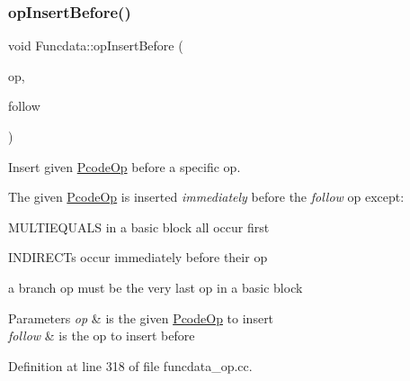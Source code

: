 \subsubsection{\texorpdfstring{opInsertBefore()}{opInsertBefore()}}
{\footnotesize\ttfamily void Funcdata\+::op\+Insert\+Before (\begin{DoxyParamCaption}\item[{\mbox{\hyperlink{class_pcode_op}{Pcode\+Op}} $\ast$}]{op,  }\item[{\mbox{\hyperlink{class_pcode_op}{Pcode\+Op}} $\ast$}]{follow }\end{DoxyParamCaption})}



Insert given \mbox{\hyperlink{class_pcode_op}{Pcode\+Op}} before a specific op. 

The given \mbox{\hyperlink{class_pcode_op}{Pcode\+Op}} is inserted {\itshape immediately} before the {\itshape follow} op except\+:
\begin{DoxyItemize}
\item M\+U\+L\+T\+I\+E\+Q\+U\+A\+LS in a basic block all occur first
\item I\+N\+D\+I\+R\+E\+C\+Ts occur immediately before their op
\item a branch op must be the very last op in a basic block
\end{DoxyItemize}


\begin{DoxyParams}{Parameters}
{\em op} & is the given \mbox{\hyperlink{class_pcode_op}{Pcode\+Op}} to insert \\
\hline
{\em follow} & is the op to insert before \\
\hline
\end{DoxyParams}


Definition at line 318 of file funcdata\+\_\+op.\+cc.

